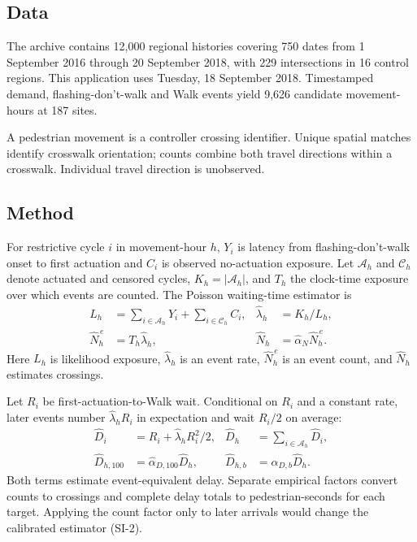 \documentclass[11pt]{article}
\begin{document}
\subsection{Data}

The archive contains 12,000 regional histories covering 750 dates from 1 September 2016 through 20 September 2018, with 229 intersections in 16 control regions. This application uses Tuesday, 18 September 2018. Timestamped demand, flashing-don't-walk and Walk events yield 9,626 candidate movement-hours at 187 sites.

A pedestrian movement is a controller crossing identifier. Unique spatial matches identify crosswalk orientation; counts combine both travel directions within a crosswalk. Individual travel direction is unobserved.

\subsection{Method}

For restrictive cycle $i$ in movement-hour $h$, $Y_i$ is latency from flashing-don't-walk onset to first actuation and $C_i$ is observed no-actuation exposure. Let $\mathcal A_h$ and $\mathcal C_h$ denote actuated and censored cycles, $K_h=|\mathcal A_h|$, and $T_h$ the clock-time exposure over which events are counted. The Poisson waiting-time estimator is
\begin{equation}
\begin{aligned}
L_h&=\sum_{i\in\mathcal A_h}Y_i+\sum_{i\in\mathcal C_h}C_i,
&\widehat\lambda_h&=K_h/L_h,\\
\widehat N_h^{\,e}&=T_h\widehat\lambda_h,
&\widehat N_h&=\widehat\alpha_N\widehat N_h^{\,e}.
\end{aligned}
\label{eq:rate}
\end{equation}
Here $L_h$ is likelihood exposure, $\widehat\lambda_h$ is an event rate, $\widehat N_h^{\,e}$ is an event count, and $\widehat N_h$ estimates crossings.

Let $R_i$ be first-actuation-to-Walk wait. Conditional on $R_i$ and a constant rate, later events number $\widehat\lambda_hR_i$ in expectation and wait $R_i/2$ on average:
\begin{equation}
\begin{aligned}
\widehat D_i&=R_i+\widehat\lambda_hR_i^2/2,
&\widehat D_h&=\sum_{i\in\mathcal A_h}\widehat D_i,\\
\widehat D_{h,100}&=\widehat\alpha_{D,100}\widehat D_h,
&\widehat D_{h,b}&=\widehat\alpha_{D,b}\widehat D_h.
\end{aligned}
\label{eq:delay}
\end{equation}
Both terms estimate event-equivalent delay. Separate empirical factors convert counts to crossings and complete delay totals to pedestrian-seconds for each target. Applying the count factor only to later arrivals would change the calibrated estimator (SI-2).
\end{document}
